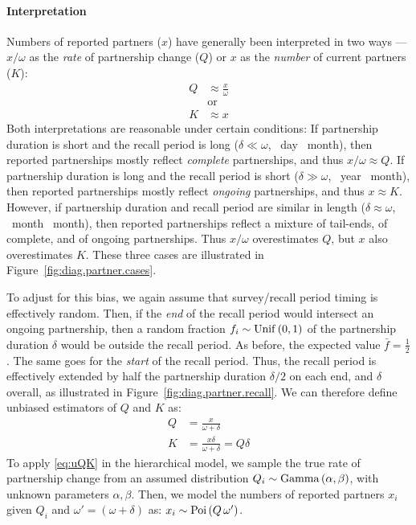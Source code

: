 \paragraph{Interpretation}
Numbers of reported partners ($x$) have generally been interpreted in two ways ---
$x/\omega$ as the \emph{rate} of partnership change ($Q$) or
$x$ as the \emph{number} of current partners ($K$):
\begin{subequations}\label{eq:bQK}
\begin{alignat}{1}
  Q &\approx \frac{x}{\omega} \label{eq:bQ}\\
    &\text{or} \nonumber\\
  K &\approx x \label{eq:bK}
\end{alignat}
\end{subequations}
Both interpretations are reasonable under certain conditions:
If partnership duration is short and the recall period is long
($\delta \ll \omega$, ~day ~month),
then reported partnerships mostly reflect \emph{complete} partnerships,
and thus $x/\omega \approx Q$.
If partnership duration is long and the recall period is short
($\delta \gg \omega$, ~year ~month),
then reported partnerships mostly reflect \emph{ongoing} partnerships,
and thus $x \approx K$.
However, if partnership duration and recall period are similar in length
($\delta \approx \omega$, ~month ~month),
then reported partnerships reflect a mixture of tail-ends, of complete, and of ongoing partnerships.
Thus $x/\omega$ overestimates $Q$, but $x$ also overestimates $K$.
These three cases are illustrated in Figure~\ref{fig:diag.partner.cases}.
\par
To adjust for this bias, we again assume that survey/recall period timing is effectively random.
Then, if the \emph{end} of the recall period would intersect an ongoing partnership,
then a random fraction $f_i \sim \mathrm{Unif}\,(0,1)$ of the partnership duration $\delta$
would be outside the recall period.
As before, the expected value $\bar{f} = \frac12$.
The same goes for the \emph{start} of the recall period.
Thus, the recall period is effectively extended by
half the partnership duration $\delta/2$ on each end, and $\delta$ overall,
as illustrated in Figure~\ref{fig:diag.partner.recall}.
We can therefore define unbiased estimators of $Q$ and $K$ as:
\begin{subequations}\label{eq:uQK}
\begin{alignat}{1}
  Q &= \frac{x}{\omega + \delta}\\
  K &= \frac{x \delta}{\omega + \delta} = Q \delta
\end{alignat}
\end{subequations}
To apply \eqref{eq:uQK} in the hierarchical model, we sample the true rate of partnership change
from an assumed distribution $Q_i \sim \mathrm{Gamma}\,(\alpha,\beta)$,
with unknown parameters $\alpha, \beta$.
Then, we model the numbers of reported partners $x_i$
given $Q_i$ and $\omega' = (\omega + \delta)$ as: $x_i \sim \mathrm{Poi}\,(Q\,\omega')$.
